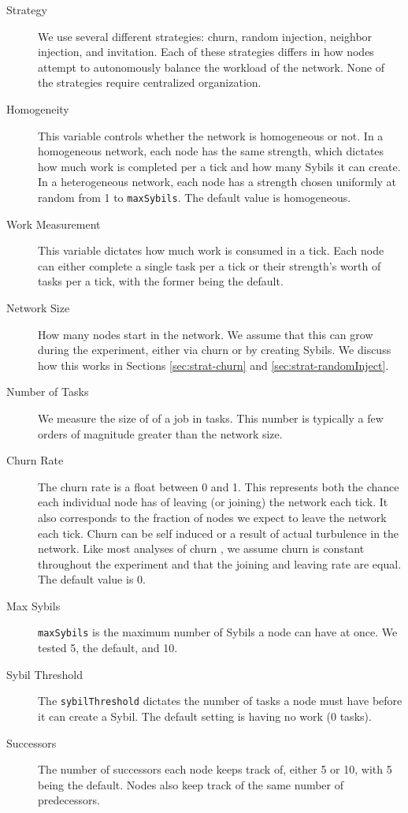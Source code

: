 \documentclass[11pt,letterpaper]{article}
\begin{document}
\begin{description}
	\item [Strategy] We use several different strategies: churn, random injection, neighbor injection, and invitation.
	Each of these strategies differs in how nodes attempt  to autonomously balance the workload of the network.
	None of the strategies require centralized organization.
	\item [Homogeneity]  This variable controls whether the network is homogeneous or not.
	In a homogeneous network, each node has the same strength, which dictates how much work is completed per a tick and how many Sybils it can create.
	In a heterogeneous network, each node has a strength chosen uniformly at random from 1 to \texttt{maxSybils}.
	The default value is homogeneous.
	\item [Work Measurement] This variable dictates how much work is consumed in a tick.
	Each node can either complete a single task per a tick or their strength's worth of tasks per a tick, with the former being the default.
	\item [Network Size]  How many nodes start in the network.  
	We assume that this can grow during the experiment, either via churn or by creating Sybils.
	We discuss how this works in Sections \ref{sec:strat-churn} and \ref{sec:strat-randomInject}.
	\item [Number of Tasks] We measure the size of of a job in tasks.
	This number is typically a few orders of magnitude greater than the network size.
	\item [Churn Rate] The churn rate is a float between 0 and 1.
	This represents both the chance each individual node has of leaving (or joining) the network each tick.
	It also corresponds to the fraction of nodes we expect to leave the network each tick.
	Churn can be self induced or a result of actual turbulence in the network.
	Like most analyses of churn \cite{marozzo2012p2p}, we assume churn is constant throughout the experiment and that the joining and leaving rate are equal.
	The default value is 0.
	\item [Max Sybils] \texttt{maxSybils} is the maximum number of Sybils a node can have at once.  We tested 5, the default, and 10.
	\item [Sybil Threshold] The \texttt{sybilThreshold} dictates the number of tasks a node must have before it can create a Sybil.  The default setting is having no work (0 tasks).
	\item [Successors] The number of successors each node keeps track of, either 5 or 10, with 5 being the default.
	Nodes also keep track of the same number of predecessors.
	
\end{description}
\end{document}
